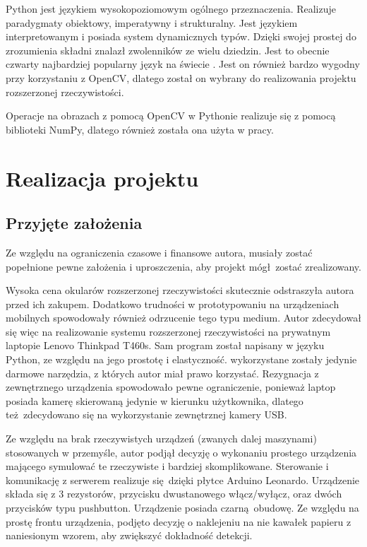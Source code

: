 \documentclass[12pt,twoside,polish]{article}
\begin{document}

Python jest językiem wysokopoziomowym ogólnego przeznaczenia. Realizuje paradygmaty obiektowy, imperatywny i strukturalny. Jest językiem interpretowanym i posiada system dynamicznych typów. Dzięki swojej prostej do zrozumienia składni znalazł zwolenników ze wielu dziedzin. Jest to obecnie czwarty najbardziej popularny język na świecie \cite{stackoverflow}. Jest on również bardzo wygodny przy korzystaniu z OpenCV, dlatego został on wybrany do realizowania projektu rozszerzonej rzeczywistości.

Operacje na obrazach z pomocą OpenCV w Pythonie realizuje się z pomocą biblioteki NumPy, dlatego również została ona użyta w pracy.


\clearpage	

\section{Realizacja projektu}
\subsection{Przyjęte założenia}
Ze względu na ograniczenia czasowe i finansowe autora, musiały zostać popełnione pewne założenia i uproszczenia, aby projekt mógł zostać zrealizowany.

Wysoka cena okularów rozszerzonej rzeczywistości skutecznie odstraszyła autora przed ich zakupem. Dodatkowo trudności w prototypowaniu na urządzeniach mobilnych spowodowały również odrzucenie tego typu medium. Autor zdecydował się więc na realizowanie systemu rozszerzonej rzeczywistości na prywatnym laptopie Lenovo Thinkpad T460s. Sam program został napisany w języku Python, ze względu na jego prostotę i elastyczność. wykorzystane zostały jedynie darmowe narzędzia, z których autor miał prawo korzystać. Rezygnacja z zewnętrznego urządzenia spowodowało pewne ograniczenie, ponieważ laptop posiada kamerę skierowaną jedynie w kierunku użytkownika, dlatego też zdecydowano się na wykorzystanie zewnętrznej kamery USB.

Ze względu na brak rzeczywistych urządzeń (zwanych dalej maszynami) stosowanych w przemyśle, autor podjął decyzję o wykonaniu prostego urządzenia mającego symulować te rzeczywiste i bardziej skomplikowane. Sterowanie i komunikację z serwerem realizuje się dzięki płytce Arduino Leonardo. Urządzenie składa się z 3 rezystorów, przycisku dwustanowego włącz/wyłącz, oraz dwóch przycisków typu pushbutton. Urządzenie posiada czarną obudowę. Ze względu na prostę frontu urządzenia, podjęto decyzję o naklejeniu na nie kawałek papieru z naniesionym wzorem, aby zwiększyć dokładność detekcji.
\end{document}
